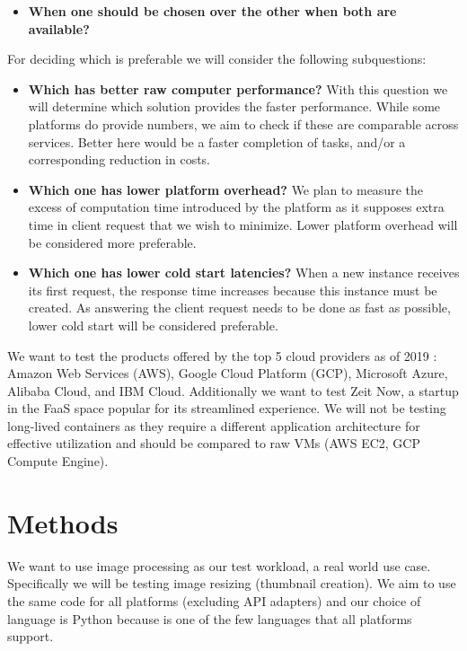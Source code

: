 \documentclass[11pt]{article}
\begin{document}
\begin{itemize}
\item \textbf{When one should be chosen over the other when both are available?}
\end{itemize}

For deciding which is preferable we will consider the following subquestions:

\begin{itemize}
\item \textbf{Which has better raw computer performance?} With this question we will determine which solution provides the faster performance. While some platforms do provide numbers, we aim to check if these are comparable across services. Better here would be a faster completion of tasks, and/or a corresponding reduction in costs.

\item \textbf{Which one has lower platform overhead?}  We plan to measure the excess of computation time introduced by the platform as it supposes extra time in client request that we wish to minimize. Lower platform overhead will be considered more preferable.

\item \textbf{Which one has lower cold start latencies?} When a new instance receives its first request, the response time increases because this instance must be created. As answering the client request needs to be done as fast as possible, lower cold start will be considered preferable.
\end{itemize}


We want to test the products offered by the top 5 cloud providers as of 2019 \cite{hh}: Amazon Web Services (AWS), Google Cloud Platform (GCP), Microsoft Azure, Alibaba Cloud, and IBM Cloud. Additionally we want to test Zeit Now, a startup in the FaaS space popular for its streamlined experience. We will not be testing long-lived containers as they require a different application architecture for effective utilization and should be compared to raw VMs (AWS EC2, GCP Compute Engine).


\section{Methods}
\label{methods}
We want to use image processing as our test workload, a real world \cite{ii} use case. Specifically we will be testing image resizing (thumbnail creation). We aim to use the same code for all platforms (excluding API adapters) and our choice of language is Python because is one of the few languages that all platforms support.
\end{document}
